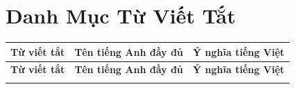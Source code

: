 \chapter*{Danh Mục Từ Viết Tắt}

\begin{longtable}{L{3.2cm} L{7.5cm} L{4.5cm}}
\toprule
\textbf{Từ viết tắt} & \textbf{Tên tiếng Anh đầy đủ} & \textbf{Ý nghĩa tiếng Việt} \\
\midrule
\endfirsthead
\toprule
\textbf{Từ viết tắt} & \textbf{Tên tiếng Anh đầy đủ} & \textbf{Ý nghĩa tiếng Việt} \\
\midrule
\endhead
\bottomrule
\endfoot


\end{longtable}
